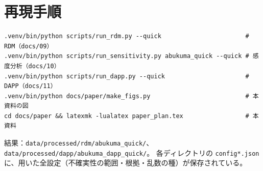 \documentclass[a4paper,10pt]{ltjsarticle}
\begin{document}
\clearpage
\appendix
\section{再現手順}
\begin{verbatim}
.venv/bin/python scripts/run_rdm.py --quick                       # RDM（docs/09）
.venv/bin/python scripts/run_sensitivity.py abukuma_quick --quick # 感度分析（docs/10）
.venv/bin/python scripts/run_dapp.py --quick                      # DAPP（docs/11）
.venv/bin/python docs/paper/make_figs.py                          # 本資料の図
cd docs/paper && latexmk -lualatex paper_plan.tex                 # 本資料
\end{verbatim}
結果：\texttt{data/processed/rdm/abukuma\_quick/}、\texttt{data/processed/dapp/abukuma\_dapp\_quick/}。
各ディレクトリの \texttt{config*.json} に、用いた全設定（不確実性の範囲・根拠・乱数の種）が保存されている。
\end{document}

